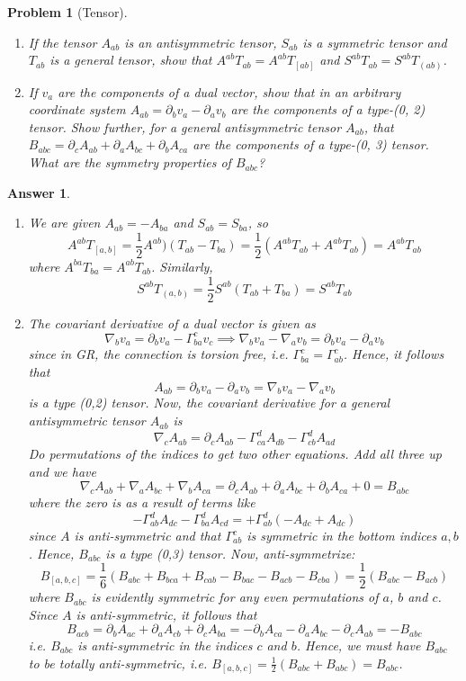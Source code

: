 \documentclass[a4paper]{article}
\newtheorem{ans}{Answer}[subsection]
\theoremstyle{new}
\newtheorem{qns}{Problem}[section]
\begin{document}
\newpage
\begin{qns}[Tensor]\leavevmode
\begin{enumerate}[label=(\alph*)]
\item If the tensor $A_{ab}$ is an antisymmetric tensor, $S_{ab}$ is a symmetric tensor and $T_{ab}$ is a general tensor, show that $A^{ab}T_{ab} = A^{ab}T_{[ab]}$ and $S^{ab}T_{ab}=S^{ab}T_{(ab)}$. 
\item If $v_a$ are the components of a dual vector, show that in an arbitrary coordinate system $A_{ab} = \partial_bv_a−\partial_av_b$ are the components of a type-(0, 2) tensor. Show further, for a general antisymmetric tensor $A_{ab}$, that $B_{abc} = \partial_cA_{ab} + \partial_aA_{bc} + \partial_bA_{ca}$ are the components of a type-(0, 3) tensor. What are the symmetry properties of $B_{abc}$?
\end{enumerate}
\end{qns}
\begin{ans}\leavevmode
\begin{enumerate}[label=(\alph*)]
\item We are given $A_{ab}=-A_{ba}$ and $S_{ab}=S_{ba}$, so
$$A^{ab}T_{[a,b]}=\frac{1}{2}A^{ab})(T_{ab}-T_{ba})=\frac{1}{2}(A^{ab}T_{ab}+A^{ab}T_{ab})=A^{ab}T_{ab}$$
where $A^{ba}T_{ba}=A^{ab}T_{ab}$. Similarly,
$$S^{ab}T_{(a,b)}=\frac{1}{2}S^{ab}(T_{ab}+T_{ba})=S^{ab}T_{ab}$$
\item The covariant derivative of a dual vector is given as
$$\nabla_bv_a=\partial_bv_a-\Gamma^c_{ba}v_c\implies\nabla_bv_a-\nabla_av_b=\partial_bv_a-\partial_av_b$$
since in GR, the connection is torsion free, i.e. $\Gamma_{ba}^c=\Gamma^c_{ab}$. Hence, it follows that
$$A_{ab}=\partial_bv_a-\partial_av_b=\nabla_bv_a-\nabla_av_b$$
is a type (0,2) tensor. Now, the covariant derivative for a general antisymmetric tensor $A_{ab}$ is
$$\nabla_cA_{ab}=\partial_cA_{ab}-\Gamma_{ca}^dA_{db}-\Gamma_{cb}^dA_{ad}$$
Do permutations of the indices to get two other equations. Add all three up and we have
$$\nabla_cA_{ab}+\nabla_aA_{bc}+\nabla_bA_{ca}=\partial_cA_{ab}+\partial_aA_{bc}+\partial_bA_{ca}+0=B_{abc}$$
where the zero is as a result of terms like
$$-\Gamma_{ab}^dA_{dc}-\Gamma_{ba}^dA_{cd}=+\Gamma_{ab}^d(-A_{dc}+A_{dc})$$
since $A$ is anti-symmetric and that $\Gamma_{ab}^c$ is symmetric in the bottom indices $a,b$. Hence, $B_{abc}$ is a type (0,3) tensor. Now, anti-symmetrize:
$$B_{[a,b,c]}=\frac{1}{6}(B_{abc}+B_{bca}+B_{cab}-B_{bac}-B_{acb}-B_{cba})=\frac{1}{2}(B_{abc}-B_{acb})$$
where $B_{abc}$ is evidently symmetric for any even permutations of $a$, $b$ and $c$. Since $A$ is anti-symmetric, it follows that
$$B_{acb}=\partial_bA_{ac}+\partial_aA_{cb}+\partial_cA_{ba}=-\partial_bA_{ca}-\partial_aA_{bc}-\partial_cA_{ab}=-B_{abc}$$
i.e. $B_{abc}$ is anti-symmetric in the indices $c$ and $b$. Hence, we must have $B_{abc}$ to be totally anti-symmetric, i.e. $B_{[a,b,c]}=\frac{1}{2}(B_{abc}+B_{abc})=B_{abc}$.
\end{enumerate}
\end{ans}
\newpage
\end{document}
